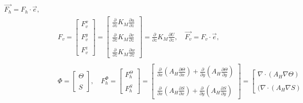 \documentclass[oribibl]{llncs}
\begin{document}
\begin{eqnarray}
\vec{F_h}= F_h \cdot \vec{e}
,   \quad \\
&&F_v=
\left[                 
  \begin{array}{c}  
   F_v^x  \\  \nonumber \\ 
   F_v^y  \\ \nonumber \\ 
   F_v^z
  \end{array}
\right]=
\left[                 
  \begin{array}{c}  
   \frac{\partial }{\partial z} K_M  \frac{\partial u}{\partial z}  \\  \nonumber \\ 
   \frac{\partial }{\partial z} K_M  \frac{\partial v}{\partial z}  \\  \nonumber \\ 
    \frac{\partial }{\partial z} K_M  \frac{\partial w}{\partial z} 
  \end{array}
\right]= \frac{\partial }{\partial z} K_M  \frac{\partial U}{\partial z} 
, \quad
\vec{F_v}= F_v \cdot \vec{e},   \\ \nonumber \\ 
&&\Phi=
\left[                 
  \begin{array}{c}  
   \Theta  \\  \nonumber \\ 
   S
  \end{array}
\right]
, \quad
F_h^{\Phi}=
\left[                 
  \begin{array}{c}  
   F_h^\Theta  \\  \nonumber \\ 
   F_h^S
  \end{array}
\right]=
\left[
  \begin{array}{c}  
  \frac{\partial}{\partial x} \left ( A_H \frac{\partial \Theta }{\partial x} \right ) + \frac{\partial}{\partial y} \left ( A_H \frac{\partial \Theta }{\partial y} \right )  \\  \nonumber \\ 
   \frac{\partial}{\partial x} \left ( A_H \frac{\partial S}{\partial x} \right ) + \frac{\partial}{\partial y} \left ( A_H \frac{\partial S}{\partial y} \right )
  \end{array}
\right]=
\left[
  \begin{array}{c}  
   \nabla \cdot (A_H   \nabla  \Theta) \\  \nonumber \\ 
  (\nabla \cdot (A_H   \nabla S) 
  \end{array}

\end{eqnarray}
\end{document}
